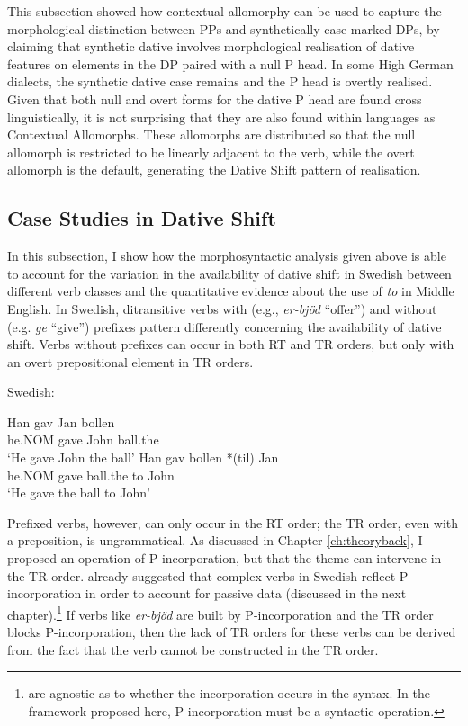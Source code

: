 	This subsection showed how contextual allomorphy can be used to capture the morphological distinction between PPs and synthetically case marked DPs, by claiming that synthetic dative involves morphological realisation of dative features on elements in the DP paired with a null P head. In some High German dialects, the synthetic dative case remains and the P head is overtly realised. Given that both null and overt forms for the dative P head are found cross linguistically, it is not surprising that they are also found within languages as Contextual Allomorphs. These allomorphs are distributed so that the null allomorph is restricted to be linearly adjacent to the verb, while the overt allomorph is the default, generating the Dative Shift pattern of realisation.
	\subsection{Case Studies in Dative Shift}
	In this subsection, I show how the morphosyntactic analysis given above is able to account for the variation in the availability of dative shift in Swedish between different verb classes and the quantitative evidence about the use of \textit{to} in Middle English. 
	In Swedish, ditransitive verbs with (e.g., \textit{er-bjöd} ``offer'') and without (e.g. \textit{ge} ``give'') prefixes pattern differently concerning the availability of dative shift. Verbs without prefixes can occur in both RT and TR orders, but only with an overt prepositional element in TR orders.
		\begin{exe}
			\ex Swedish:\label{ex:sw-act-simple}
			\begin{xlist}
				\ex \gll Han gav Jan bollen\\
				he.NOM gave John ball.the\\
				\trans `He gave John the ball'
				\ex \gll Han gav bollen *(til) Jan\\
				he.NOM gave ball.the to John\\
				\trans `He gave the ball to John'
			\end{xlist}
		\end{exe}
		Prefixed verbs, however, can only occur in the RT order; the TR order, even with a preposition, is ungrammatical. As discussed in Chapter \ref{ch:theoryback}, I proposed an operation of P-incorporation, but that the theme can intervene in the TR order. \cite{Holmberg.1995} already suggested that complex verbs in Swedish reflect P-incorporation in order to account for passive data (discussed in the next chapter).\footnote{\cite{Holmber.1995} are agnostic as to whether the incorporation occurs in the syntax. In the framework proposed here, P-incorporation must be a syntactic operation.} If verbs like \textit{er-bjöd} are built by P-incorporation and the TR order blocks P-incorporation, then the lack of TR orders for these verbs can be derived from the fact that the verb cannot be constructed in the TR order.
